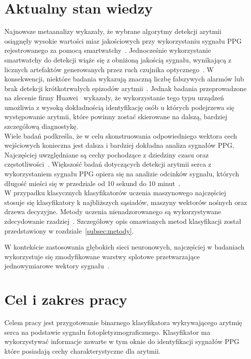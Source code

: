 \documentclass[a4paper,twoside,12pt]{book}
\begin{document}
\section{Aktualny stan wiedzy}


Najnowsze metaanalizy wykazały, że wybrane algorytmy detekcji arytmii osiągnęły wysokie wartości miar jakościowych przy wykorzystaniu sygnału PPG rejestrowanego za pomocą smartwatchy~\cite{Luo2025}. Jednocześnie wykorzystanie smartwatchy do detekcji wiąże się z obniżoną jakością sygnału, wynikającą z licznych artefaktów generowanych przez ruch czujnika optycznego~\cite{Pereira2020}. W konsekwencji, niektóre badania wykazują znaczną liczbę fałszywych alarmów lub brak detekcji krótkotrwałych epizodów arytmii~\cite{Huntelaar2024}. Jednak badania przeprowadzone na zlecenie firmy Huawei~\cite{Guo2019} wykazały, że wykorzystanie tego typu urządzeń umożliwia z wysoką dokładnością identyfikację osób u których podejrzewa się występowanie arytmii, które powinny zostać skierowane na dalszą, bardziej szczegółową diagnostykę.\\

Wiele badań podkreśla, że w celu skonstruowania odpowiedniego wektora cech wejściowych konieczna jest dalsza i bardziej dokładna analiza sygnałów PPG. Najczęściej uwzględniane są cechy pochodzące z dziedziny czasu oraz częstotliwości~\cite{Pereira2016, Paiva2018, Pereira2019}. Większość badań dotyczących detekcji arytmii serca z wykorzystaniem sygnału PPG opiera się na analizie odcinków sygnału, których długość mieści się w przedziale od 10 sekund do 10 minut~\cite{Pereira2020}.\\

W przypadku klasycznych klasyfikatorów uczenia maszynowego najczęściej stosuje się klasyfikatory k najbliższych sąsiadów, maszyny wektorów nośnych oraz drzewa decyzyjne. Metody uczenia nienadzorowanego są wykorzystywane zdecydowanie rzadziej~\cite{Pereira2020}. Szczegółowy opis omawianych metod klasyfikacji został przedstawiony w rozdziale~\ref{subsec:metody}.

W kontekście zastosowania głębokich sieci neuronowych, najczęściej w badaniach wykorzystuje się zmodyfikowane warstwy splotowe przetwarzające jednowymiarowe wektory sygnału~\cite{Kudo2023}.




\section{Cel i zakres pracy}
Celem pracy jest przygotowanie binarnego klasyfikatora wykrywającego arytmię serca na podstawie sygnału fotopletyzmograficznego.
Klasyfikator ma wykorzystywać informacje zawarte w tym oknie do identyfikacji sygnałów PPG które posiadają cechy charakterystyczne dla arytmii.\\
\end{document}
